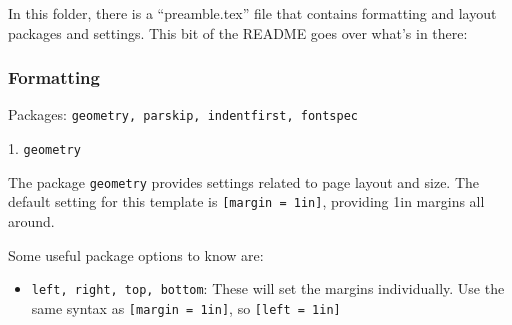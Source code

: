 \documentclass{article}
\begin{document}
In this folder, there is a ``preamble.tex'' file that contains formatting and layout packages and settings. This bit of the README goes over what's in there: 


\subsubsection{Formatting}

Packages: \texttt{geometry, parskip, indentfirst, fontspec}

1. \texttt{geometry}

    The package \texttt{geometry} provides settings related to page layout and size. The default setting for this template is \texttt{[margin = 1in]}, providing 1in margins all around. 

    Some useful package options to know are: 

    \begin{itemize}
        \item \texttt{left, right, top, bottom}: These will set the margins individually. Use the same syntax as \texttt{[margin = 1in]}, so \texttt{[left = 1in]}
    \end{itemize}



\end{document}
